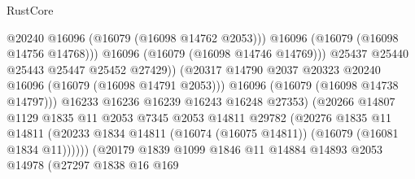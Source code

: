 \begin{lexlean}{RustCore}
\begin{coremodule}
                                            @20240
                                            @16096
                                            (@16079 (@16098 @14762 @2053)))
                                          @16096
                                          (@16079 (@16098 @14756 @14768)))
                                        @16096
                                        (@16079 (@16098 @14746 @14769)))
                                      @25437
                                      @25440
                                      @25443
                                      @25447
                                      @25452
                                      @27429))
                                  (@20317
                                    @14790
                                    @2037
                                    @20323
                                    @20240
                                    @16096
                                    (@16079 (@16098 @14791 @2053)))
                                  @16096
                                  (@16079 (@16098 @14738 @14797)))
                                @16233
                                @16236
                                @16239
                                @16243
                                @16248
                                @27353)
                              (@20266
                                @14807
                                @1129
                                @1835
                                @11
                                @2053
                                @7345
                                @2053
                                @14811
                                @29782
                                (@20276
                                  @1835
                                  @11
                                  @14811
                                  (@20233
                                    @1834
                                    @14811
                                    (@16074 (@16075 @14811))
                                    (@16079 (@16081 @1834 @11))))))
                            (@20179
                              @1839
                              @1099
                              @1846
                              @11
                              @14884
                              @14893
                              @2053
                              @14978
                              (@27297
                                @1838
                                @16
                                @169

\end{coremodule}
\end{lexlean}
